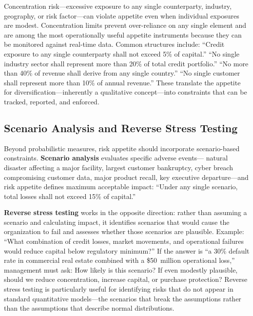 \documentclass[11pt,openany]{book}
\begin{document}
Concentration risk---excessive exposure to any single counterparty, industry,
geography, or risk factor---can violate appetite even when individual exposures
are modest. Concentration limits prevent over-reliance on any single element
and are among the most operationally useful appetite instruments because they
can be monitored against real-time data. Common structures include: ``Credit
exposure to any single counterparty shall not exceed 5\% of capital.'' ``No
single industry sector shall represent more than 20\% of total credit
portfolio.'' ``No more than 40\% of revenue shall derive from any single
country.'' ``No single customer shall represent more than 10\% of annual
revenue.'' These translate the appetite for diversification---inherently a
qualitative concept---into constraints that can be tracked, reported, and
enforced.

\subsection{Scenario Analysis and Reverse Stress Testing}
\label{subsec:scenario-reverse-stress}

Beyond probabilistic measures, risk appetite should incorporate scenario-based
constraints. \textbf{Scenario analysis} evaluates specific adverse events---
natural disaster affecting a major facility, largest customer bankruptcy, cyber
breach compromising customer data, major product recall, key executive
departure---and risk appetite defines maximum acceptable impact: ``Under any
single scenario, total losses shall not exceed 15\% of capital.''

\textbf{Reverse stress testing} works in the opposite direction: rather than
assuming a scenario and calculating impact, it identifies scenarios that would
cause the organization to fail and assesses whether those scenarios are
plausible. Example: ``What combination of credit losses, market movements, and
operational failures would reduce capital below regulatory minimum?'' If the
answer is ``a 30\% default rate in commercial real estate combined with a
\$50~million operational loss,'' management must ask: How likely is this
scenario? If even modestly plausible, should we reduce concentration, increase
capital, or purchase protection? Reverse stress testing is particularly useful
for identifying risks that do not appear in standard quantitative models---the
scenarios that break the assumptions rather than the assumptions that describe
normal distributions.
\end{document}
